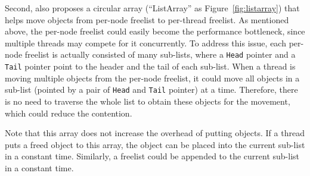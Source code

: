 Second, \NM{} also proposes a circular array (``ListArray'' as Figure~\ref{fig:listarray}) that helps move objects from per-node freelist to per-thread freelist. As mentioned above, the per-node freelist could easily become the performance bottleneck, since multiple threads may compete for it concurrently. To address this issue, each per-node freelist is actually consisted of many sub-lists, where a \texttt{Head} pointer and a \texttt{Tail} pointer point to the header and the tail of each sub-list. When a thread is moving multiple objects from the per-node freelist, it could move all objects in a sub-list (pointed by a pair of \texttt{Head} and \texttt{Tail} pointer) at a time. Therefore, there is no need to traverse the whole list to obtain these objects for the movement, which could reduce the contention. 


Note that this array does not increase the overhead of putting objects. If a thread puts a freed object to this array, the object can be placed into the current sub-list in a constant time. Similarly, a freelist could be appended to the current sub-list in a constant time. 

